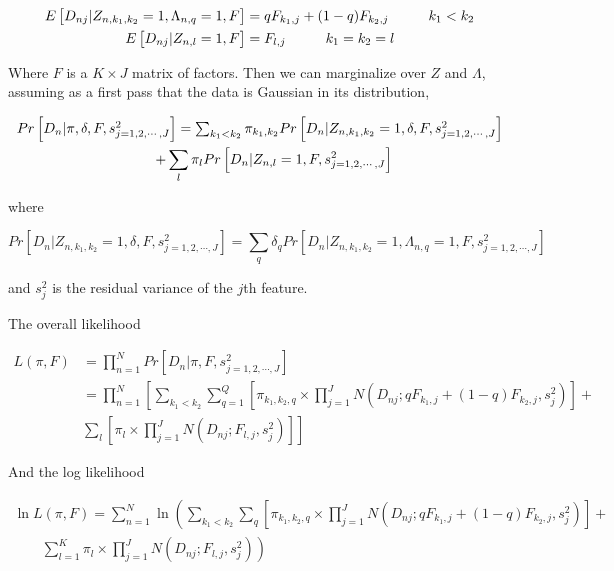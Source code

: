\documentclass[11pt,authoryear]{article}
\begin{document}
\begin{align}
 E \left [ D_{nj} | Z_{n, k_1, k_2} = 1, \Lambda_{n,q}=1, F \right] &= q
  F_{k_1,j} + (1-q) F_{k_2,j} \hspace{1 cm} k_1<k_2 \nonumber \\
 E \left [ D_{nj} | Z_{n,l} = 1, F \right] &= F_{l,j} \hspace{1 cm} k_1 = k_2 = l 
\end{align}

Where $F$ is a $K\times J$ matrix of factors. 
Then we can marginalize over $Z$ and $\Lambda$, assuming as a first pass 
that the data is Gaussian in its distribution,

\begin{multline}
 $$ Pr \left [ D_{n} | \pi, \delta, F, s^2_{j=1,2,\cdots,J} \right ] = \sum_{k_1 < k_2}
 \pi_{k_1, k_2} Pr \left [ D_{n} | Z_{n, k_1, k_2}=1, \delta, F, s^2_{j=1,2,\cdots,J} \right ]  \\
   \qquad +  \sum_{l} \pi_{l} Pr \left [ D_{n} | Z_{n, l}=1,  F, s^2_{j=1,2,\cdots,J} \right ]$$
 \end{multline}

where 

$$ Pr \left [ D_{n} | Z_{n, k_1, k_2}=1, \delta, F, s^2_{j=1,2,\cdots,J} \right ] = \sum_{q} \delta_{q} Pr \left [D_{n} | Z_{n, k_1, k_2}=1, \Lambda_{n, q}=1, F, s^2_{j=1,2,\cdots,J} \right ] $$

and $s^2_{j}$ is the residual variance of the $j$th feature.
 
The overall likelihood 

\begin{align}
L(\pi, F) &= \prod_{n=1}^{N} Pr \left [ D_{n} | \pi, F, s^2_{j=1,2,\cdots,J}
\right ] \nonumber \\
 &= \prod_{n=1}^{N} \left [ \sum_{k_1 < k_2} \sum_{q=1}^{Q} \left [ \pi_{k_1,k_2, q} \times \prod_{j=1}^{J} N \left (D_{nj}; q F_{k_1,j} + (1-q) F_{k_2, j}, s^2_{j} \right) \right ] + \right.\nonumber \\
 & \left. \sum_{l} \left [ \pi_{l} \times \prod_{j=1}^{J} N \left (D_{nj}; F_{l,j} , s^2_{j} \right) \right ] \right]
\end{align}

And the log likelihood

\begin{multline}
\ln {L (\pi, F)} = \sum_{n=1}^{N} \ln \left (\sum_{k_1 < k_2} \sum_{q} \left [ \pi_{k_1,k_2, q} \times \prod_{j=1}^{J} N \left (D_{nj}; q F_{k_1,j} + (1-q) F_{k_2, j}, s^2_{j} \right) \right ] + \right . \\
\left. \qquad \sum_{l=1}^{K} \pi_{l}  \times \prod_{j=1}^{J} N \left (D_{nj}; F_{l,j}, s^2_{j} \right)\right )
\end{multline}
\end{document}
